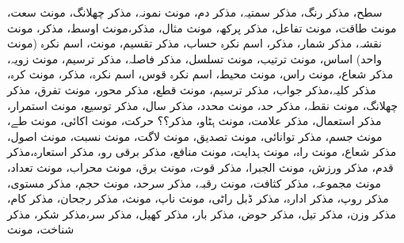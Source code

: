 سطح، مذکر
رنگ، مذکر
سمتیہ، مذکر
دم، مونث
نمونہ، مذکر
چھلانگ، مونث
سعت، مونث
طاقت، مونث
تفاعل، مذکر
پرکھ، مونث
مثال، مذکر،مونث
اوسط، مذکر، مونث
نقشہ، مذکر
شمار، مذکر، اسم نکرہ
حساب، مذکر
تقسیم، مونث، اسم نکرہ (مونث واحد)
اساس، مونث
ترتیب، مونث
تسلسل، مذکر
فاصلہ، مذکر
ترسیم، مونث
زویہ، مذکر
شعاع، مونث
راس، مونث
محیط، اسم نکرہ
قوس، اسم نکرہ، مذکر، مونث
کرہ، مذکر
کلیہ،مذکر
جواب، مذکر
ترسیم، مونث
قطع، مذکر
محور، مونث
تفرق، مذکر
چھلانگ، مونث
نقطہ، مذکر
حد، مونث
محدد، مذکر
سال، مذکر
توسیع، مونث
استمرار، مذکر
استعمال، مذکر
علامت، مونث
ہٹاو، مذکر؟؟
حرکت، مونث
اکائی، مونث
طے، مونث
جسم، مذکر
توانائی، مونث
تصدیق، مونث
لاگت، مونث
نسبت، مونث
اصول، مذکر
شعاع، مونث
راہ، مونث
ہدایت، مونث
منافع، مذکر
برقی رو، مذکر
استعارہ،مذکر
قدم، مذکر
ورزش، مونث
الجبرا، مذکر
قوت، مونث
برق، مونث
محراب، مونث
تعداد، مونث
مجموعہ، مذکر
کثافت، مونث
رقبہ، مذکر
سرحد، مونث
حجم، مذکر
مستوی، مذکر
روپ، مذکر
ادارہ، مذکر
ڈبل راٹی، مونث
ناپ، مونث، مذکر
رجحان، مذکر
کام، مذکر
وزن، مذکر
تیل، مذکر
حوض، مذکر
بار، مذکر
کھیل، مذکر
سر،مذکر
شکر، مذکر
شناخت، مونث

